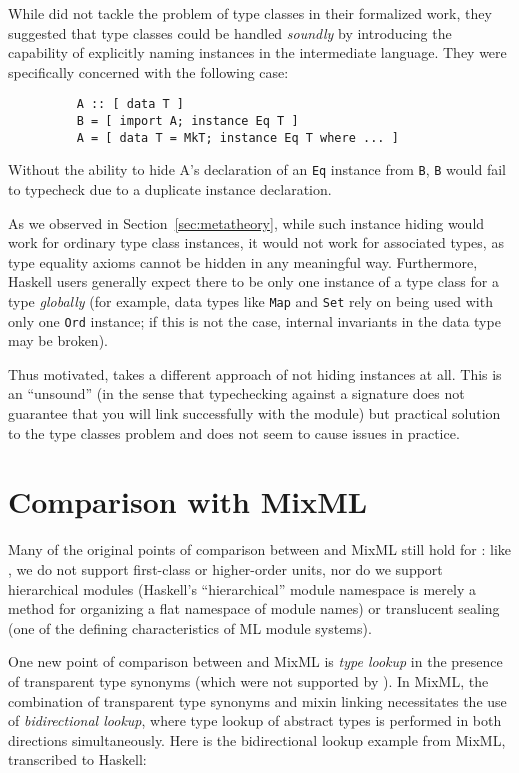 While \OldBackpack{} did not tackle the problem of type classes in their
formalized work, they suggested that type classes could be handled
\emph{soundly} by introducing the capability of explicitly naming instances
in the intermediate language.  They were specifically concerned with the
following case:

\begin{figure}[H]
\begin{lstlisting}
    A :: [ data T ]
    B = [ import A; instance Eq T ]
    A = [ data T = MkT; instance Eq T where ... ]
\end{lstlisting}
\end{figure}

\noindent
Without the ability to hide A's declaration of an \verb|Eq| instance
from \verb|B|, \verb|B| would fail to typecheck due to a duplicate
instance declaration.

As we observed in Section~\ref{sec:metatheory}, while such instance
hiding would work for ordinary type class instances, it would not work
for associated types, as type equality axioms cannot be hidden in any
meaningful way.  Furthermore, Haskell users generally expect there
to be only one instance of a type class for a type \emph{globally} (for
example, data types like \verb|Map| and \verb|Set| rely on being used
with only one \verb|Ord| instance; if this is not the case, internal
invariants in the data type may be broken).

Thus motivated, \Backpack{} takes a different approach of not hiding
instances at all.  This is an ``unsound'' (in the sense that typechecking
against a signature does not guarantee that you will link successfully
with the module) but practical solution to the type classes problem
and does not seem to cause issues in practice.

\section{Comparison with MixML}

Many of the original points of comparison between \OldBackpack{} and
MixML still hold for \Backpack{}: like \OldBackpack{}, we do not support
first-class or higher-order units, nor do we support hierarchical
modules (Haskell's ``hierarchical'' module namespace is merely a method
for organizing a flat namespace of module names) or translucent sealing
(one of the defining characteristics of ML module systems).

One new point of comparison between \Backpack{} and MixML is \emph{type lookup}
in the presence of transparent type synonyms (which were not supported
by \OldBackpack{}).  In MixML, the combination of transparent type
synonyms and mixin linking necessitates the use of \emph{bidirectional lookup}, where
type lookup of abstract types is performed in both directions simultaneously.
Here is the bidirectional lookup example from MixML, transcribed to Haskell:

